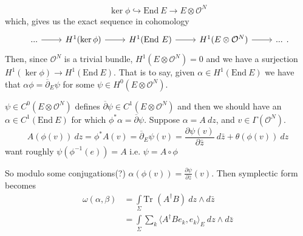 \documentclass[]{article}
\newcommand{\C}{\mathbb{C}}
\newcommand{\OO}{\mathcal{O}}
\newcommand{\End}{\text{End}~}
\newcommand{\dbar}{\overline{\partial}}
\newcommand{\PP}{\mathbb{P}}
\newcommand{\Tr}{\text{Tr }}
\begin{document}
	\begin{equation}
		\ker \phi \hookrightarrow \End E \to E\otimes \OO^N
	\end{equation}
	which, gives us the exact sequence in cohomology
	\[\begin{tikzcd}
		{...} & {H^1(\ker \phi)} & {H^1(\End E)} & {H^1(E\otimes \OO^N)} & {...}
		\arrow[from=1-2, to=1-3]
		\arrow[from=1-3, to=1-4]
		\arrow[from=1-1, to=1-2]
		\arrow[from=1-4, to=1-5]
	\end{tikzcd}.\]
	Then, since $\OO^N$ is a trivial bundle, $H^1(E\otimes \OO^N) = 0$ and we have a surjection $H^1(\ker\phi) \to H^1(\End E)$. That is to say, given $\alpha \in H^1(\End E)$ we have that $\alpha \phi = \dbar_E \psi$ for some $\psi \in H^0(E\otimes \OO^N)$.
	
	$\psi \in C^0(E\otimes \OO^N)$ defines $\dbar \psi \in C^1(E\otimes \OO^N)$ and then we should have an $\alpha \in C^1(\End E)$ for which $\phi^\ast \alpha = \dbar \psi$. Suppose $\alpha = A~dz$, and $v\in \Gamma(\OO^N)$.
	\begin{equation}
	A(\phi(v)) ~dz =\phi^\ast A(v) = \dbar_E \psi(v)= \frac{\partial \psi(v)}{\partial \bar{z}} ~d\bar{z} + \theta(\phi(v)) ~dz
	\end{equation}
	want roughly $\psi(\phi^{-1}(e)) = A$ i.e. $\psi = A\circ \phi$
	
	So modulo some conjugations(?) $\alpha(\phi(v)) = \frac{\partial\psi}{\partial \bar{z}}(v)$. Then symplectic form becomes
	\begin{align*}
		\omega(\alpha,\beta)&=\int\limits_{\Sigma} \Tr (A^\dagger B) ~ dz\wedge d\bar{z}\\
		&= \int\limits_{\Sigma}\sum_{k} \langle A^\dagger B e_k, e_k\rangle_E ~dz \wedge d\bar{z}
	\end{align*}
	\fi
	\iffalse
	Now we add in the parabolic structure. At a puncture $p_i$, the map $\alpha_i:E\to \C_{p_i}$ acts on global sections $\sigma \in \Gamma(E)$ by
	\begin{equation}
		\alpha_i(\sigma) = \alpha_i(\sigma(p_i)),
	\end{equation}
	and we call this action $\hat{\alpha_i}$, in 
	\begin{equation}
		V_2 := H^0(\OO^N)^\ast.
	\end{equation}
	We get one copy of $V_2$ for each puncture. Furthermore, parabolic structures are only up to the independent scale of the $\alpha_i$, so we represent the equivalence class of $(E,\alpha)$ as \begin{equation}
	[\hat{\beta}],[\hat{\alpha}])\in \PP(V_1)\times_{i=1}^n \PP(V_2).
	\end{equation}
	Let $X$ denote the closed subvariety of this space consisting of the image of Quot under the above injection.
	\fi
	
\end{document}

